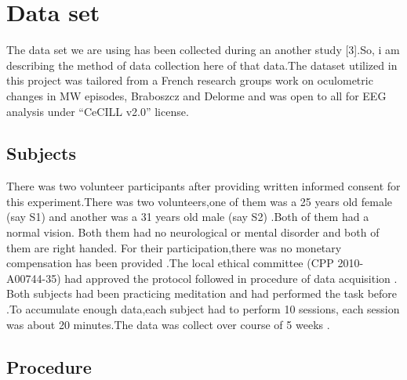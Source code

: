 
\chapter{Data set} %

\label{Chapter3} %

The data set we are using has been collected during an another study [3].So, i am describing the method of data collection here of that data.The dataset utilized in this project was tailored from a French research groups work on oculometric changes in MW episodes, Braboszcz and Delorme \cite{grandchamp2014oculometric} and was open to all for EEG analysis under “CeCILL v2.0” license.

\section{Subjects}
There was two  volunteer participants after providing written informed consent for this experiment.There was two volunteers,one of them was a 25 years old female (say S1)  and another was  a 31 years old male  (say S2) \cite{grandchamp2014oculometric}.Both of them had a normal vision. Both them had  no neurological or mental disorder and both of them are right handed. For their participation,there was no monetary compensation has been provided .The local ethical committee (CPP 2010-A00744-35) had approved  the protocol followed in procedure of data acquisition  \citet{grandchamp2014oculometric}. Both subjects had been practicing meditation and had performed the task before .To accumulate enough data,each subject had to perform 10 sessions, each session was about 20 minutes.The data was collect over course of 5 weeks \cite{grandchamp2014oculometric}.
\section{Procedure}
 
